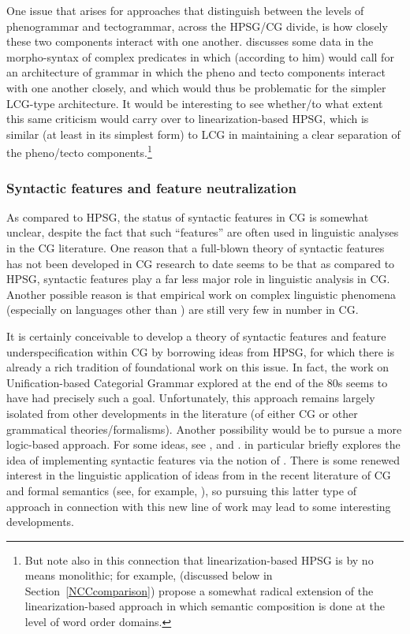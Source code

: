 \documentclass[output=paper
                ,modfonts
 	        ,biblatex
                ,babelshorthands
                ,newtxmath
                ,draftmode
                ,colorlinks, citecolor=brown
]{langscibook}
\begin{document}
One issue that arises for approaches that distinguish between the
levels of phenogrammar and tectogrammar, across the HPSG/CG divide, is
how closely these two components interact with one another.
\citet[Section~2.3]{Kubota2014a-u} discusses some data in the morpho-syntax of
complex predicates in  which (according to him) would call for
an architecture of grammar in which the pheno and tecto components
interact with one another closely, and which would thus be problematic
for the simpler LCG-type architecture. It would be interesting to see
whether/to what extent this same criticism would carry over to
linearization-based HPSG, which is similar (at least in its simplest
form) to LCG in maintaining a clear separation of the pheno/tecto
components.\footnote{But note also in this connection that
linearization-based HPSG is by no means monolithic; for example,
\citet{yatabe-tam2017} (discussed below in
Section~\ref{NCCcomparison}) propose a somewhat radical extension of
the linearization-based approach in which semantic composition is done at
the level of word order domains.}


\subsubsection{Syntactic features and feature neutralization}

As compared to HPSG, the status of syntactic features in CG is
somewhat unclear, despite the fact that such ``features'' are often used
in linguistic analyses in the CG literature. One reason that a
full-blown theory of syntactic features has not been developed in CG
research to date seems to be that as compared to HPSG, syntactic
features play a far less major role in linguistic analysis in CG.
Another possible reason is that empirical work on complex linguistic
phenomena (especially on languages other than ) are still very
few in number in CG. 

It is certainly conceivable to develop a theory of syntactic features
and feature underspecification within CG by borrowing ideas from HPSG,
for which there is already a rich tradition of foundational work on this
issue. In fact, the work on Unification-based Categorial Grammar
\citep*{CalderEA1988} explored at the end of the 80s seems to have had
precisely such a goal. Unfortunately, this approach remains largely
isolated from other developments in the literature (of either CG or
other grammatical theories/formalisms). Another possibility would be to pursue a
more logic-based approach. For some ideas, see \citet{BJ95},
\citet{Bayer96}
and \citet{Morrill94a-u}. \citet[Chapter~6]{Morrill94a-u} in particular briefly
explores the idea of implementing syntactic features via the notion of
. There is some renewed interest in
the linguistic application of ideas from  \citep{MartinLofIntuitionistic} in the recent literature
of CG and formal semantics (see, for example,
\citealt{ChatzikyriakidisLuo2017}), so pursuing this latter type of
approach in connection with this new line of work may lead to some
interesting developments.
\end{document}

